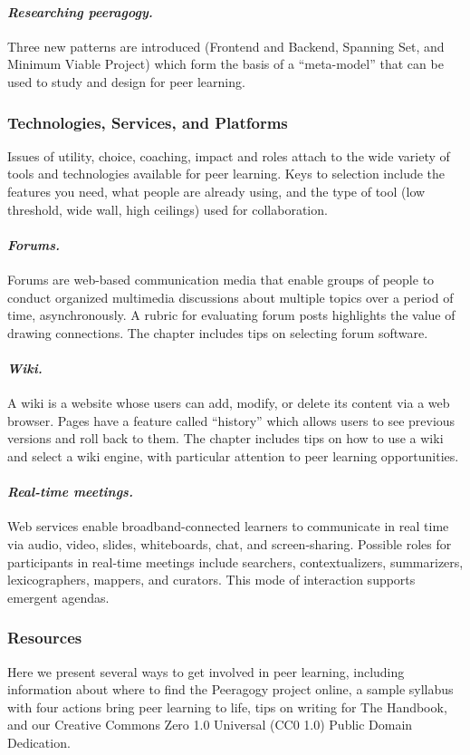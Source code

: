 \paragraph{\emph{Researching peeragogy.}} Three new patterns are introduced
(Frontend and Backend, Spanning Set, and Minimum Viable Project) which
form the basis of a ``meta-model'' that can be used to study and
design for peer learning.

\subsubsection{Technologies, Services, and Platforms}

\noindent Issues of utility, choice, coaching, impact and roles attach
to the wide variety of tools and technologies available for peer
learning. Keys to selection include the features you need, what people
are already using, and the type of tool (low threshold, wide wall,
high ceilings) used for collaboration.

\paragraph{\emph{Forums.}} Forums are web-based communication media
that enable groups of people to conduct organized multimedia discussions
about multiple topics over a period of time, asynchronously. A rubric
for evaluating forum posts highlights the value of drawing connections.
The chapter includes tips on selecting forum software.

\paragraph{\emph{Wiki.}} A
wiki is a website whose users can add, modify, or delete its content via
a web browser. Pages have a feature called ``history'' which allows
users to see previous versions and roll back to them. The chapter
includes tips on how to use a wiki and select a wiki engine, with
particular attention to peer learning opportunities.

 \paragraph{\emph{Real-time meetings.}} Web services enable broadband-connected
learners to communicate in real time via audio, video, slides,
whiteboards, chat, and screen-sharing. Possible roles for participants
in real-time meetings include searchers, contextualizers, summarizers,
lexicographers, mappers, and curators. This mode of interaction
supports emergent agendas.

\subsubsection{Resources}

\noindent Here we present several ways to get involved in peer
learning, including information about where to find the Peeragogy
project online, a sample syllabus with four actions bring peer
learning to life, tips on writing for The Handbook, and our Creative
Commons Zero 1.0 Universal (CC0 1.0) Public Domain Dedication.
